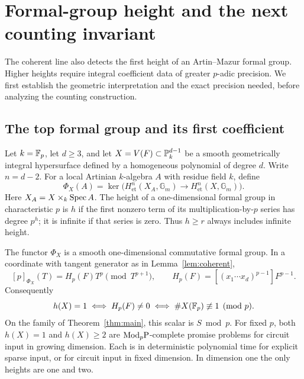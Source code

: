\section{Formal-group height and the next counting invariant}\label{fg:sec:height}
The coherent line also detects the first height of an Artin--Mazur formal
group. Higher heights require integral coefficient data of greater
$p$-adic precision. We first establish the geometric interpretation and
the exact precision needed, before analyzing the counting construction.

\subsection{The top formal group and its first coefficient}
Let $k=\mathbb F_p$, let $d\ge3$, and let $X=V(F)\subset\mathbb P^{d-1}_k$ be a smooth
geometrically integral hypersurface defined by a homogeneous polynomial
of degree $d$. Write $n=d-2$. For a local Artinian $k$-algebra $A$ with
residue field $k$, define
\[
 \Phi_X(A)=\ker\bigl(H^n_{\mathrm{et}}(X_A,\mathbb G_m)
                    \longrightarrow H^n_{\mathrm{et}}(X,\mathbb G_m)\bigr).
\]
Here $X_A=X\times_k\operatorname{Spec} A$. The height of a one-dimensional formal group
in characteristic $p$ is $h$ if the first nonzero term of its
multiplication-by-$p$ series has degree $p^h$; it is infinite if that series
is zero. Thus $h\ge r$ always includes infinite height.

\begin{proposition}\label{fg:prop:height-one}
The functor $\Phi_X$ is a smooth one-dimensional commutative formal group.
In a coordinate with tangent generator as in Lemma~\ref{lem:coherent},
\[
 [p]_{\Phi_X}(T)=H_p(F)T^p\pmod{T^{p+1}},\qquad
 H_p(F)=[(x_1\cdots x_d)^{p-1}]F^{p-1}.
\]
Consequently
\[
 h(X)=1\iff H_p(F)\ne0\iff\#X(\mathbb F_p)\not\equiv1\pmod p.
\]
On the family of Theorem~\ref{thm:main}, this scalar is $S\bmod p$.
For fixed $p$, both $h(X)=1$ and $h(X)\ge2$ are $\mathrm{Mod}_p\mathrm P$-complete
promise problems for circuit input in growing dimension. Each is in
deterministic polynomial time for explicit sparse input, or for circuit
input in fixed dimension. In dimension one the only heights are one and
two.
\end{proposition}

